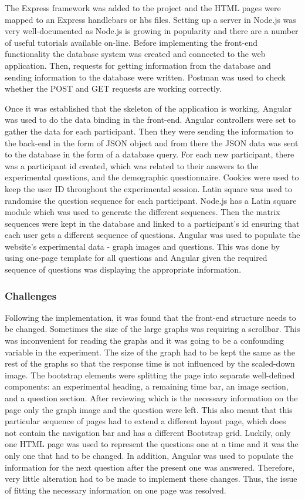 \documentclass{l4proj}
\begin{document}
The Express framework was added to the project and the HTML pages were mapped to an Express handlebars or hbs files. Setting up a server in Node.js was very well-documented as Node.js is growing in popularity and there are a number of useful tutorials available on-line. Before implementing the front-end functionality the database system was created and connected to the web application. Then, requests for getting information from the database and sending information to the database were written. Postman was used to check whether the POST and GET requests are working correctly. 

Once it was established that the skeleton of the application is working, Angular was used to do the data binding in the front-end. Angular controllers were set to gather the data for each participant. Then they were sending the information to the back-end in the form of JSON object and from there the JSON data was sent to the database in the form of a database query. For each new participant, there was a participant id created, which was related to their answers to the experimental questions, and the demographic questionnaire. Cookies were used to keep the user ID throughout the experimental session. Latin square was used to randomise the question sequence for each participant. Node.js has a Latin square module which was used to generate the different sequences. Then the matrix sequences were kept in the database and linked to a participant's id ensuring that each user gets a different sequence of questions. Angular was used to populate the website's experimental data - graph images and questions. This was done by using one-page template for all questions and Angular given the required sequence of questions was displaying the appropriate information. 

\subsubsection{Challenges}

Following the implementation, it was found that the front-end structure needs to be changed. Sometimes the size of the large graphs was requiring a scrollbar. This was inconvenient for reading the graphs and it was going to be a confounding variable in the experiment. The size of  the graph had to be kept the same as the rest of the graphs so that the response time is not influenced by the scaled-down image. The bootstrap elements were splitting the page into separate well-defined components: an experimental heading, a remaining time bar, an image section, and a question section. After reviewing which is the necessary information on the page only the graph image and the question were left. This also meant that this particular sequence of pages had to extend a different layout page, which does not contain the navigation bar and has a different Bootstrap grid. Luckily, only one HTML page was used to represent the questions one at a time and it was the only one that had to be changed. In addition, Angular was used to populate the information for the next question after the present one was answered. Therefore, very little alteration had to be made to implement these changes. Thus, the issue of fitting the necessary information on one page was resolved.
\end{document}
